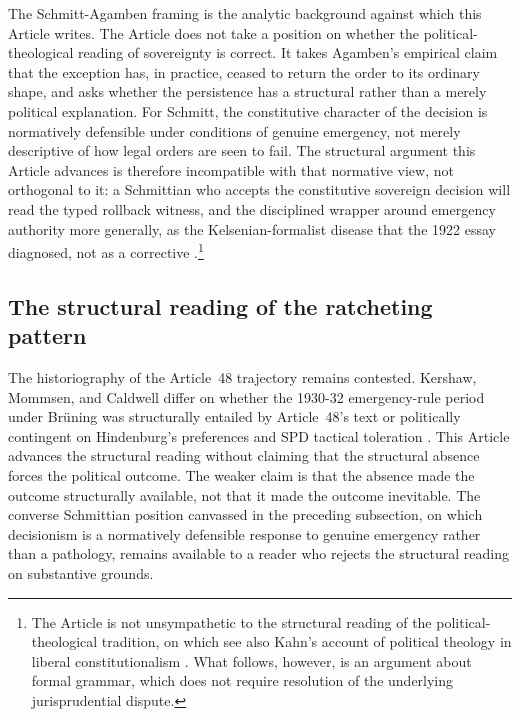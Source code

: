 The Schmitt-Agamben framing is the analytic background against which this Article writes.
The Article does not take a position on whether the political-theological reading of sovereignty is correct.
It takes Agamben's empirical claim that the exception has, in practice, ceased to return
the order to its ordinary shape,
and asks whether the persistence has a structural rather than a merely political explanation.
For Schmitt, the constitutive character of the decision is normatively defensible under conditions of genuine
emergency, not merely descriptive of how legal orders are seen to fail.
The structural argument this Article advances is therefore incompatible with that normative view,
not orthogonal to it: a Schmittian who accepts the constitutive sovereign decision will read the
typed rollback witness, and the disciplined wrapper around emergency authority more generally,
as the Kelsenian-formalist disease that the 1922 essay diagnosed, not as a corrective
\cite{ref_caldwell_popular_sovereignty,ref_dyzenhaus_legality_legitimacy}.\footnote{%
The Article is not unsympathetic to the structural reading of the political-theological tradition,
on which see also Kahn's account of political theology in liberal constitutionalism \cite{ref_kahn_political_theology}.
What follows, however, is an argument about formal grammar,
which does not require resolution of the underlying jurisprudential dispute.}

\subsection{The structural reading of the ratcheting pattern}

The historiography of the Article~48 trajectory remains contested.
Kershaw, Mommsen, and Caldwell differ on whether the 1930-32 emergency-rule period under Br\"uning
was structurally entailed by Article~48's text or politically contingent on Hindenburg's preferences
and SPD tactical toleration
\cite{ref_kershaw_hitler,ref_mommsen_weimar,ref_caldwell_popular_sovereignty}.
This Article advances the structural reading without claiming that the structural absence forces the political outcome.
The weaker claim is that the absence made the outcome structurally available, not that it made the outcome inevitable.
The converse Schmittian position canvassed in the preceding subsection,
on which decisionism is a normatively defensible response to genuine emergency rather than a pathology,
remains available to a reader who rejects the structural reading on substantive grounds.

